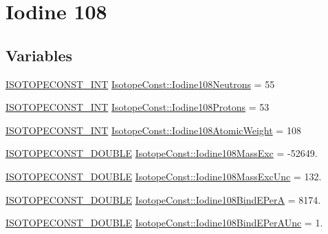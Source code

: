\hypertarget{group___isotope_const-_iodine-_i108}{}\section{Iodine 108}
\label{group___isotope_const-_iodine-_i108}
\subsection*{Variables}
\begin{DoxyCompactItemize}
\item 
\mbox{\hyperlink{group___isotope_const-_macros_ga5f18360b3e99483a35c32d789e62621c}{I\+S\+O\+T\+O\+P\+E\+C\+O\+N\+S\+T\+\_\+\+I\+NT}} \mbox{\hyperlink{group___isotope_const-_iodine-_i108_ga9e90612aa53efbd6864c16ab8792ad8d}{Isotope\+Const\+::\+Iodine108\+Neutrons}} = 55
\item 
\mbox{\hyperlink{group___isotope_const-_macros_ga5f18360b3e99483a35c32d789e62621c}{I\+S\+O\+T\+O\+P\+E\+C\+O\+N\+S\+T\+\_\+\+I\+NT}} \mbox{\hyperlink{group___isotope_const-_iodine-_i108_gac3a7b31507c09c748be1d1d93c680a62}{Isotope\+Const\+::\+Iodine108\+Protons}} = 53
\item 
\mbox{\hyperlink{group___isotope_const-_macros_ga5f18360b3e99483a35c32d789e62621c}{I\+S\+O\+T\+O\+P\+E\+C\+O\+N\+S\+T\+\_\+\+I\+NT}} \mbox{\hyperlink{group___isotope_const-_iodine-_i108_ga70541b1f68d9ae1ffef23491f31583a0}{Isotope\+Const\+::\+Iodine108\+Atomic\+Weight}} = 108
\item 
\mbox{\hyperlink{group___isotope_const-_macros_ga8f45a7272ce02c0b4c65c44636ed719a}{I\+S\+O\+T\+O\+P\+E\+C\+O\+N\+S\+T\+\_\+\+D\+O\+U\+B\+LE}} \mbox{\hyperlink{group___isotope_const-_iodine-_i108_ga6767e2dcb61493353d3f228f516c2fe3}{Isotope\+Const\+::\+Iodine108\+Mass\+Exc}} = -\/52649.
\item 
\mbox{\hyperlink{group___isotope_const-_macros_ga8f45a7272ce02c0b4c65c44636ed719a}{I\+S\+O\+T\+O\+P\+E\+C\+O\+N\+S\+T\+\_\+\+D\+O\+U\+B\+LE}} \mbox{\hyperlink{group___isotope_const-_iodine-_i108_gac858fb55398957787b6dc87db4b8c6f5}{Isotope\+Const\+::\+Iodine108\+Mass\+Exc\+Unc}} = 132.
\item 
\mbox{\hyperlink{group___isotope_const-_macros_ga8f45a7272ce02c0b4c65c44636ed719a}{I\+S\+O\+T\+O\+P\+E\+C\+O\+N\+S\+T\+\_\+\+D\+O\+U\+B\+LE}} \mbox{\hyperlink{group___isotope_const-_iodine-_i108_ga160be1b6bb73e62bec1ad9a1eed0c031}{Isotope\+Const\+::\+Iodine108\+Bind\+E\+PerA}} = 8174.
\item 
\mbox{\hyperlink{group___isotope_const-_macros_ga8f45a7272ce02c0b4c65c44636ed719a}{I\+S\+O\+T\+O\+P\+E\+C\+O\+N\+S\+T\+\_\+\+D\+O\+U\+B\+LE}} \mbox{\hyperlink{group___isotope_const-_iodine-_i108_ga272d0b883b889d75256c03a73b55c147}{Isotope\+Const\+::\+Iodine108\+Bind\+E\+Per\+A\+Unc}} = 1.

\end{DoxyCompactItemize}
